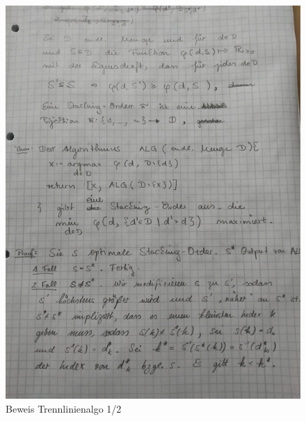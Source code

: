 \documentclass[a4paper,11pt]{article}
\begin{document}
\begin{figure}[htp]
  \includegraphics[width=\textwidth,height=\textheight,keepaspectratio]{assets/david_proof1.jpg}
  \caption{Beweis Trennlinienalgo 1/2}
\end{figure}
\end{document}
